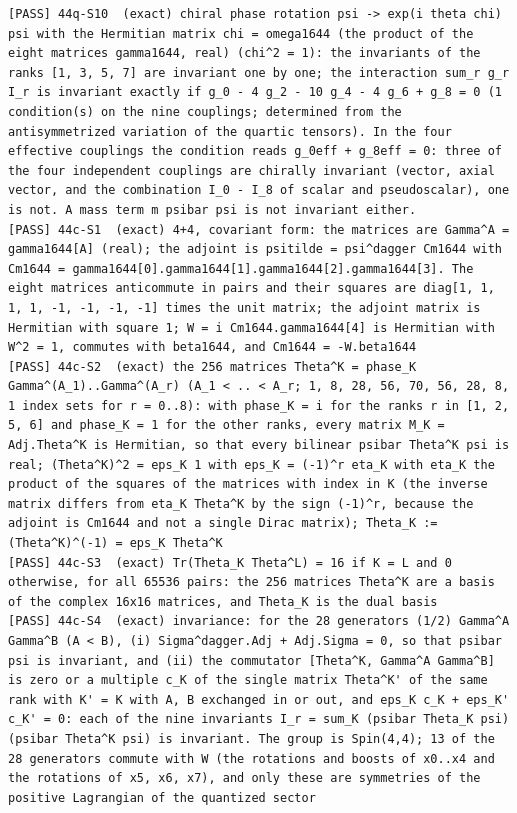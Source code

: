 \documentclass[
  10pt,
]{article}
\begin{document}
\begin{verbatim}
[PASS] 44q-S10  (exact) chiral phase rotation psi -> exp(i theta chi) psi with the Hermitian matrix chi = omega1644 (the product of the eight matrices gamma1644, real) (chi^2 = 1): the invariants of the ranks [1, 3, 5, 7] are invariant one by one; the interaction sum_r g_r I_r is invariant exactly if g_0 - 4 g_2 - 10 g_4 - 4 g_6 + g_8 = 0 (1 condition(s) on the nine couplings; determined from the antisymmetrized variation of the quartic tensors). In the four effective couplings the condition reads g_0eff + g_8eff = 0: three of the four independent couplings are chirally invariant (vector, axial vector, and the combination I_0 - I_8 of scalar and pseudoscalar), one is not. A mass term m psibar psi is not invariant either.
[PASS] 44c-S1  (exact) 4+4, covariant form: the matrices are Gamma^A = gamma1644[A] (real); the adjoint is psitilde = psi^dagger Cm1644 with Cm1644 = gamma1644[0].gamma1644[1].gamma1644[2].gamma1644[3]. The eight matrices anticommute in pairs and their squares are diag[1, 1, 1, 1, -1, -1, -1, -1] times the unit matrix; the adjoint matrix is Hermitian with square 1; W = i Cm1644.gamma1644[4] is Hermitian with W^2 = 1, commutes with beta1644, and Cm1644 = -W.beta1644
[PASS] 44c-S2  (exact) the 256 matrices Theta^K = phase_K Gamma^(A_1)..Gamma^(A_r) (A_1 < .. < A_r; 1, 8, 28, 56, 70, 56, 28, 8, 1 index sets for r = 0..8): with phase_K = i for the ranks r in [1, 2, 5, 6] and phase_K = 1 for the other ranks, every matrix M_K = Adj.Theta^K is Hermitian, so that every bilinear psibar Theta^K psi is real; (Theta^K)^2 = eps_K 1 with eps_K = (-1)^r eta_K with eta_K the product of the squares of the matrices with index in K (the inverse matrix differs from eta_K Theta^K by the sign (-1)^r, because the adjoint is Cm1644 and not a single Dirac matrix); Theta_K := (Theta^K)^(-1) = eps_K Theta^K
[PASS] 44c-S3  (exact) Tr(Theta_K Theta^L) = 16 if K = L and 0 otherwise, for all 65536 pairs: the 256 matrices Theta^K are a basis of the complex 16x16 matrices, and Theta_K is the dual basis
[PASS] 44c-S4  (exact) invariance: for the 28 generators (1/2) Gamma^A Gamma^B (A < B), (i) Sigma^dagger.Adj + Adj.Sigma = 0, so that psibar psi is invariant, and (ii) the commutator [Theta^K, Gamma^A Gamma^B] is zero or a multiple c_K of the single matrix Theta^K' of the same rank with K' = K with A, B exchanged in or out, and eps_K c_K + eps_K' c_K' = 0: each of the nine invariants I_r = sum_K (psibar Theta_K psi)(psibar Theta^K psi) is invariant. The group is Spin(4,4); 13 of the 28 generators commute with W (the rotations and boosts of x0..x4 and the rotations of x5, x6, x7), and only these are symmetries of the positive Lagrangian of the quantized sector

\end{verbatim}
\end{document}
